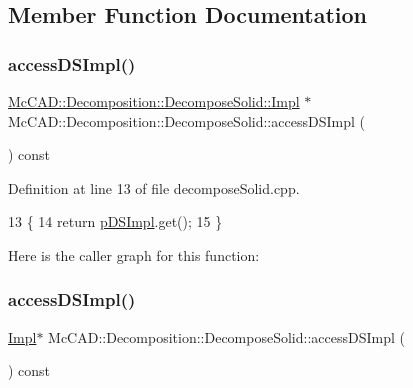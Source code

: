 \subsection{Member Function Documentation}
\mbox{\label{classMcCAD_1_1Decomposition_1_1DecomposeSolid_a383aaca9d5154e88862f948fff1d527a}} 
\subsubsection{\texorpdfstring{access\+D\+S\+Impl()}{accessDSImpl()}\hspace{0.1cm}{\footnotesize\ttfamily [1/2]}}
{\footnotesize\ttfamily \hyperlink{classMcCAD_1_1Decomposition_1_1DecomposeSolid_1_1Impl}{Mc\+C\+A\+D\+::\+Decomposition\+::\+Decompose\+Solid\+::\+Impl} $\ast$ Mc\+C\+A\+D\+::\+Decomposition\+::\+Decompose\+Solid\+::access\+D\+S\+Impl (\begin{DoxyParamCaption}{ }\end{DoxyParamCaption}) const}



Definition at line 13 of file decompose\+Solid.\+cpp.


\begin{DoxyCode}
13                                                     \{
14   \textcolor{keywordflow}{return} \hyperlink{classMcCAD_1_1Decomposition_1_1DecomposeSolid_a7f822ce5590860062e38dca471847bcc}{pDSImpl}.get();
15 \}
\end{DoxyCode}
Here is the caller graph for this function\+:
\mbox{\label{classMcCAD_1_1Decomposition_1_1DecomposeSolid_af9a2b1b8d7aa268f5ef6d4240619cf0e}} 
\subsubsection{\texorpdfstring{access\+D\+S\+Impl()}{accessDSImpl()}\hspace{0.1cm}{\footnotesize\ttfamily [2/2]}}
{\footnotesize\ttfamily \hyperlink{classMcCAD_1_1Decomposition_1_1DecomposeSolid_1_1Impl}{Impl}$\ast$ Mc\+C\+A\+D\+::\+Decomposition\+::\+Decompose\+Solid\+::access\+D\+S\+Impl (\begin{DoxyParamCaption}{ }\end{DoxyParamCaption}) const}



